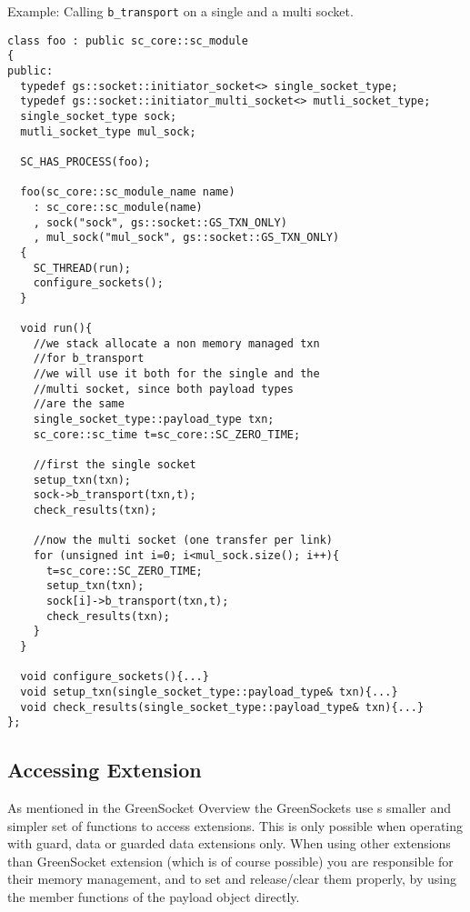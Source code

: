 \documentclass[a4paper,10pt]{article}          %
\begin{document}
Example: Calling \verb|b_transport| on a single and a multi socket.

\begin{small}
\begin{verbatim}
class foo : public sc_core::sc_module
{
public:
  typedef gs::socket::initiator_socket<> single_socket_type;
  typedef gs::socket::initiator_multi_socket<> mutli_socket_type;
  single_socket_type sock;
  mutli_socket_type mul_sock;
  
  SC_HAS_PROCESS(foo);

  foo(sc_core::sc_module_name name)
    : sc_core::sc_module(name)
    , sock("sock", gs::socket::GS_TXN_ONLY)
    , mul_sock("mul_sock", gs::socket::GS_TXN_ONLY)
  {
    SC_THREAD(run);
    configure_sockets();
  }
  
  void run(){
    //we stack allocate a non memory managed txn
    //for b_transport
    //we will use it both for the single and the
    //multi socket, since both payload types 
    //are the same
    single_socket_type::payload_type txn;
    sc_core::sc_time t=sc_core::SC_ZERO_TIME;
    
    //first the single socket
    setup_txn(txn);
    sock->b_transport(txn,t);
    check_results(txn);
    
    //now the multi socket (one transfer per link)
    for (unsigned int i=0; i<mul_sock.size(); i++){
      t=sc_core::SC_ZERO_TIME;
      setup_txn(txn);
      sock[i]->b_transport(txn,t);
      check_results(txn);
    }
  }
  
  void configure_sockets(){...}
  void setup_txn(single_socket_type::payload_type& txn){...}
  void check_results(single_socket_type::payload_type& txn){...}
};
\end{verbatim}
\end{small}

\subsection{Accessing Extension}

As mentioned in the GreenSocket Overview the GreenSockets use s smaller and simpler set of functions to access extensions. This is only possible when operating with guard, data or guarded data extensions only. When using other extensions than GreenSocket extension (which is of course possible) you are responsible for their memory management, and to set and release/clear them properly, by using the member functions of the payload object directly.
\end{document}
